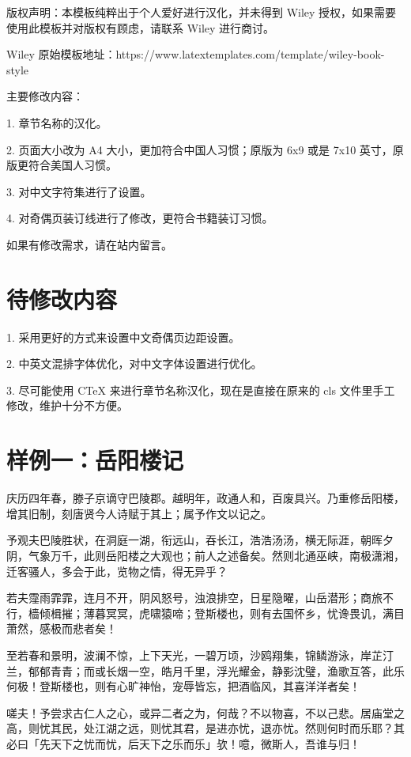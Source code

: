 \documentclass{WileySev}
\begin{document}
版权声明：本模板纯粹出于个人爱好进行汉化，并未得到 Wiley 授权，如果需要使用此模板并对版权有顾虑，请联系 Wiley 进行商讨。

Wiley 原始模板地址：https://www.latextemplates.com/template/wiley-book-style

主要修改内容：

1. 章节名称的汉化。

2. 页面大小改为 A4 大小，更加符合中国人习惯；原版为 6x9 或是 7x10 英寸，原版更符合美国人习惯。

3. 对中文字符集进行了设置。

4. 对奇偶页装订线进行了修改，更符合书籍装订习惯。

如果有修改需求，请在站内留言。

\section{待修改内容}

1. 采用更好的方式来设置中文奇偶页边距设置。

2. 中英文混排字体优化，对中文字体设置进行优化。

3. 尽可能使用 CTeX 来进行章节名称汉化，现在是直接在原来的 cls 文件里手工修改，维护十分不方便。

\section{样例一：岳阳楼记}

庆历四年春，滕子京谪守巴陵郡。越明年，政通人和，百废具兴。乃重修岳阳楼，增其旧制，刻唐贤今人诗赋于其上；属予作文以记之。

予观夫巴陵胜状，在洞庭一湖，衔远山，吞长江，浩浩汤汤，横无际涯，朝晖夕阴，气象万千，此则岳阳楼之大观也；前人之述备矣。然则北通巫峡，南极潇湘，迁客骚人，多会于此，览物之情，得无异乎？

若夫霪雨霏霏，连月不开，阴风怒号，浊浪排空，日星隐曜，山岳潜形；商旅不行，樯倾楫摧；薄暮冥冥，虎啸猿啼；登斯楼也，则有去国怀乡，忧谗畏讥，满目萧然，感极而悲者矣！

至若春和景明，波澜不惊，上下天光，一碧万顷，沙鸥翔集，锦鳞游泳，岸芷汀兰，郁郁青青；而或长烟一空，皓月千里，浮光耀金，静影沈璧，渔歌互答，此乐何极！登斯楼也，则有心旷神怡，宠辱皆忘，把酒临风，其喜洋洋者矣！

嗟夫！予尝求古仁人之心，或异二者之为，何哉？不以物喜，不以己悲。居庙堂之高，则忧其民，处江湖之远，则忧其君，是进亦忧，退亦忧。然则何时而乐耶？其必曰「先天下之忧而忧，后天下之乐而乐」欤！噫，微斯人，吾谁与归！
\end{document}
